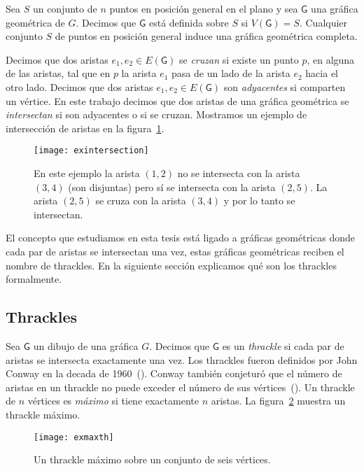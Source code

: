 Sea $S$ un conjunto de $n$ puntos en posición general en el plano y sea $\mathsf{G}$
una gráfica geométrica de $G$. Decimos que $\mathsf{G}$ está definida sobre $S$ si $V(\mathsf{G}) = S$.
Cualquier conjunto $S$ de puntos en posición general induce una gráfica geométrica completa.

Decimos que dos aristas $e_1,e_2 \in E(\mathsf{G})$ se \emph{cruzan} si existe un punto $p$,
en alguna de las aristas, tal que en $p$ la arista $e_1$ pasa de un lado de la arista
$e_2$ hacia el otro lado. Decimos que dos aristas $e_1, e_2 \in E(\mathsf{G})$ son
\emph{adyacentes} si comparten un vértice.
En este trabajo decimos que dos aristas de una gráfica geométrica se \emph{intersectan}
si son adyacentes o si se cruzan.
Mostramos un ejemplo de intersección de aristas en la figura~\ref{fig:exintersection}.
\begin{figure}[htpb]
  \centering
  \texttt{[image: exintersection]}
  \caption{En este ejemplo la arista $(1,2)$ no se intersecta con la arista $(3,4)$
  (son disjuntas) pero sí se intersecta con la arista $(2,5)$.
  La arista $(2,5)$ se cruza con la arista $(3,4)$ y por lo tanto se intersectan.}
  \label{fig:exintersection}
\end{figure}

El concepto que estudiamos en esta tesis está ligado a gráficas geométricas
donde cada par de aristas se intersectan una vez, estas gráficas geométricas
reciben el nombre de thrackles. En la siguiente sección explicamos qué son
los thrackles formalmente.

\subsection{Thrackles}
Sea $\mathsf{G}$ un dibujo de una gráfica $G$. Decimos que $\mathsf{G}$ es un
\emph{thrackle} si cada par de aristas se intersecta exactamente una vez.
Los thrackles fueron definidos por John Conway en la decada de 1960~(\cite{Pach2013}).
Conway también conjeturó que el número de aristas en un thrackle no puede
exceder el número de sus vértices~(\cite{Fulek2011}).
Un thrackle de $n$ vértices es \emph{máximo} si tiene exactamente
$n$ aristas. La figura~\ref{fig:exmaxth} muestra un thrackle máximo.

\begin{figure}[htpb]
  \centering
  \texttt{[image: exmaxth]}
  \caption{Un thrackle máximo sobre un conjunto de seis vértices.}
  \label{fig:exmaxth}
\end{figure}

